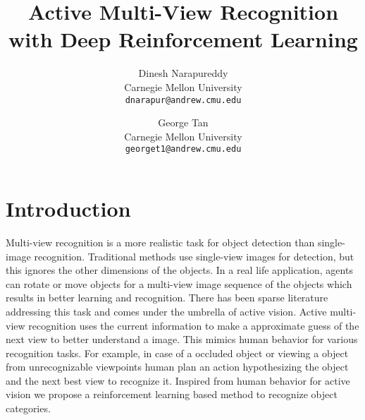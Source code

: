 \documentclass[10pt,twocolumn,letterpaper]{article}
\begin{document}
\title{Active Multi-View Recognition with Deep Reinforcement Learning}

\author{Dinesh Narapureddy\\
Carnegie Mellon University\\
{\tt\small dnarapur@andrew.cmu.edu}\\
\and
George Tan\\
Carnegie Mellon University\\
{\tt\small georget1@andrew.cmu.edu}\\
}

\maketitle
%

\section{Introduction}
	Multi-view recognition is a more realistic task for object detection than single-image recognition. Traditional methods use single-view images for detection, but this ignores the other dimensions of the objects. In a real life application, agents can rotate or move objects for a multi-view image sequence of the objects which results in better learning and recognition. There has been sparse literature addressing this task and comes under the umbrella of active vision. Active multi-view recognition uses the current information to make a approximate guess of the next view to better understand a image. This mimics human behavior for various recognition tasks. For example, in case of a occluded object or viewing a object from unrecognizable viewpoints human plan an action hypothesizing the object and the next best view to recognize it. Inspired from human behavior for active vision we propose a reinforcement learning based method to recognize object categories.   

\end{document}
